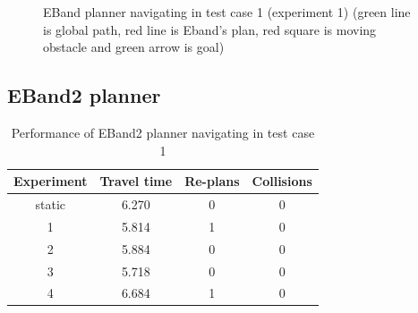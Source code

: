 \begin{figure}[H]
\begin{subfigure}[b]{0.30\linewidth}
    \end{subfigure}
    \caption{EBand planner navigating in test case 1 (experiment 1) (green line is global path, 
    red line is Eband's plan, red square is moving obstacle and green arrow is goal)}\label{fig:eband_test_case_1_exp_1}
\end{figure}

\subsection{EBand2 planner}%
\label{sub:eval_eband2_planner}

\begin{table}[H]
    \centering
    \begin{tabular}{cccc}
        \textbf{Experiment} & \textbf{Travel time} & \textbf{Re-plans} & \textbf{Collisions} \\\toprule
        static & 6.270 & 0 & 0 \\
             1 & 5.814 & 1 & 0 \\
             2 & 5.884 & 0 & 0 \\
             3 & 5.718 & 0 & 0 \\
             4 & 6.684 & 1 & 0 \\
    \end{tabular}
    \caption{Performance of EBand2 planner navigating in test case 1}\label{tab:perfomance_eband2_test_case_1}
\end{table}

